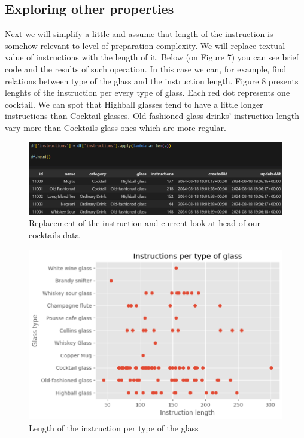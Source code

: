 \documentclass[a4paper]{article}
\begin{document}
\subsection{Exploring other properties}
Next we will simplify a little and assume that length of the instruction is somehow relevant to level of preparation complexity. We will replace textual value of instructions with the length of it. Below (on Figure 7) you can see brief code and the results of such operation. In this case we can, for example, find relations between type of the glass and the instruction length. Figure 8 presents lenghts of the instruction per every type of glass. Each red dot represents one cocktail. We can spot that Highball glasses tend to have a little longer instructions than Cocktail glasses. Old-fashioned glass drinks' instruction length vary more than Cocktails glass ones which are more regular.

\begin{figure}[H]
    \centering
    \includegraphics[width=1\linewidth]{simplify.png}
    \caption{Replacement of the instruction and  current look at head of our cocktails data}
    \label{fig:enter-label}
\end{figure}

\begin{figure}[H]
    \centering
    \includegraphics[width=0.8\linewidth]{ins length.png}
    \caption{Length of the instruction per type of the glass}
    \label{fig:enter-label}
\end{figure}
\end{document}
